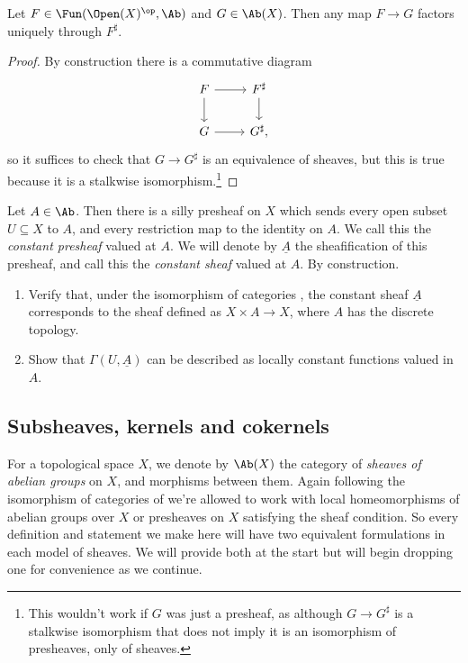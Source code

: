 \documentclass[11pt]{amsart}
\begin{document}
\begin{proposition}\label{prop:UP-of-sheafification}
Let $F\in \Fun(\Open(X)^\op,\Ab)$ and $G\in \Ab(X)$. Then any map $F \to G$ factors uniquely through $F^\sharp$.
\end{proposition}
\begin{proof} By construction there is a commutative diagram
\[ \begin{tikzcd}
    F\rar\dar & F^\sharp\dar\\
    G\rar & G^\sharp,
\end{tikzcd} \]
so it suffices to check that $G\to G^\sharp$ is an equivalence of sheaves, but this is true because it is a stalkwise isomorphism.\footnote{This wouldn't work if $G$ was just a presheaf, as although $G\to G^\sharp$ is a stalkwise isomorphism that does not imply it is an isomorphism of presheaves, only of sheaves.}
\end{proof}

\begin{exercise}
\label{exer:constant-sheaf}
Let $A\in \Ab$. Then there is a silly presheaf on $X$ which sends every open subset $U\subseteq X$ to $A$, and every restriction map to the identity on $A$. We call this the \emph{constant presheaf} valued at $A$. We will denote by $\underline{A}$ the sheafification of this presheaf, and call this the \emph{constant sheaf} valued at $A$. By construction.
\begin{enumerate}
    \item Verify that, under the isomorphism of categories , the constant sheaf $\underline{A}$ corresponds to the sheaf  defined as $X \times A \to X$, where $A$ has the discrete topology.
    \item Show that $\Gamma(U,\underline{A})$ can be described as locally constant functions valued in $A$.
\end{enumerate}
\end{exercise}


\subsection{Subsheaves, kernels and cokernels}

\begin{notation} For a topological space $X$, we denote by $\Ab(X)$ the category of \emph{sheaves of abelian groups} on $X$, and morphisms between them. Again following the isomorphism of categories of  we're allowed to work with local homeomorphisms of abelian groups over $X$ or presheaves on $X$ satisfying the sheaf condition. So every definition and statement we make here will have two equivalent formulations in each model of sheaves. We will provide both at the start but will begin dropping one for convenience as we continue.
\end{notation}
\end{document}
